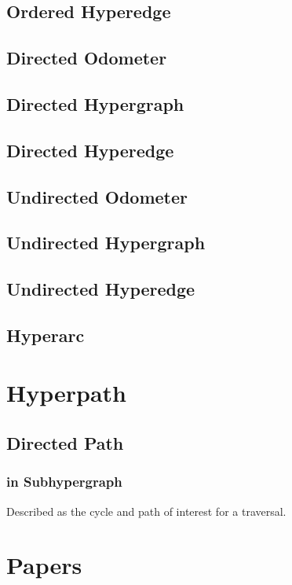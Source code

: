 \documentclass[10pt]{article}
\begin{document}
\subsection{Ordered Hyperedge}
\subsection{Directed Odometer}
\subsection{Directed Hypergraph}
\subsection{Directed Hyperedge}



\subsection{Undirected Odometer}
\subsection{Undirected Hypergraph}
\subsection{Undirected Hyperedge}
\subsection{Hyperarc}


\section{Hyperpath}

\subsection{Directed Path}
\subsubsection{in Subhypergraph}
Described as the cycle and path of interest for a traversal.
~\cite{molnar2014applications}



\section{Papers}
\end{document}
